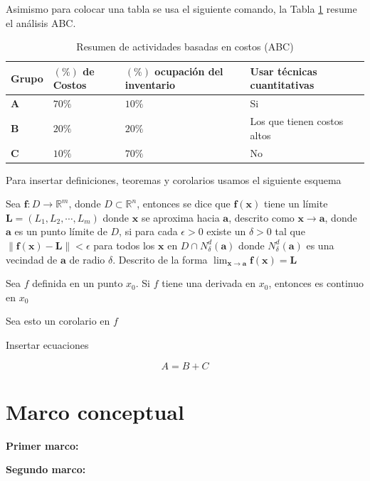 Asimismo para colocar una tabla se usa el siguiente comando, la Tabla \ref{table:ABC_resumen} resume el análisis ABC.
\begin{table}[h!]
    \caption{Resumen de actividades basadas en costos (ABC)}
    \begin{tabular}{p{0.8cm} p{2.52cm} p{5.2cm} p{4.9cm}}
        \hline
        \textbf{Grupo} & \textbf{$(\%)$ de Costos} & \textbf{$(\%)$ ocupación del inventario} & \textbf{Usar técnicas cuantitativas} \\
        \hline
        \textbf{A} & $70\%$ & $10\%$ & Si \\
        \textbf{B} & $20\%$ & $20\%$ & Los que tienen costos altos \\
        \textbf{C} & $10\%$ & $70\%$ & No \\
        \hline
    \end{tabular}
    \label{table:ABC_resumen}
\end{table}

Para insertar definiciones, teoremas y corolarios usamos el siguiente esquema

\begin{definition}
	Sea $\mathbf{f}: D \rightarrow \mathbb{R}^m$, donde $D \subset \mathbb{R}^n$, entonces se dice que $\mathbf{f(x)}$ tiene un límite $\mathbf{L}=({L}_{1},{L}_{2}, \cdots , {L}_{m})$ donde $\mathbf{x}$ se aproxima hacia $\mathbf{a}$, descrito como $\mathbf{x} \rightarrow \mathbf{a}$, donde $\mathbf{a}$ es un punto límite de $D$, si para cada $\epsilon > 0$ existe un $\delta > 0$ tal que $\| \mathbf{f(x) - L} \| < \epsilon$ para todos los $\mathbf{x}$ en $D \cap {N}_{\delta}^{d}(\mathbf{a})$ donde ${N}_{\delta}^{d}(\mathbf{a})$ es una vecindad de $\mathbf{a}$ de radio $\delta$. Descrito de la forma $\lim_{\mathbf{x} \to \mathbf{a}} \mathbf{f(x) = L}$
\end{definition}

\begin{theorem}
	Sea $f$ definida en un punto $x_0$. Si $f$ tiene una derivada en $x_0$, entonces es continuo en $x_0$
\end{theorem}

\begin{corolary}
    Sea esto un corolario en $f$
\end{corolary}

Insertar ecuaciones

\begin{equation}
    A = B + C
\end{equation}

\section{Marco conceptual}
\noindent
\textbf{Primer marco:} \lipsum[1][1-2] \citep{haquehua2025modelo}\vspace{0.25cm}

\noindent
\textbf{Segundo marco:} \lipsum[1][1-2] \citep{haquehua2025modelo}\vspace{0.25cm}






















